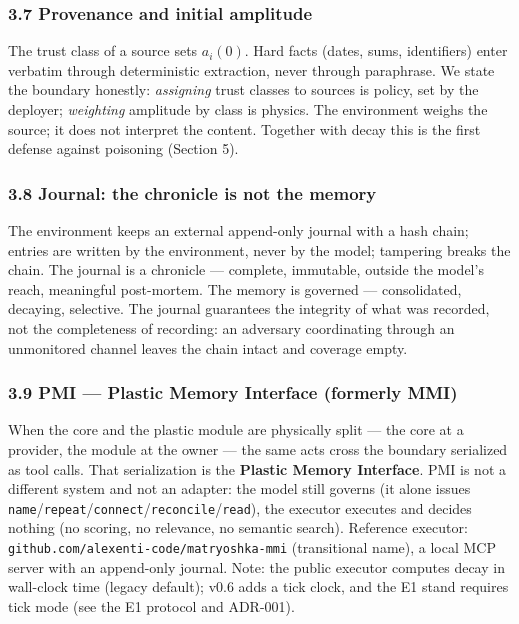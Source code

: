 \documentclass[
]{article}
\begin{document}
\subsubsection{3.7 Provenance and initial
amplitude}\label{provenance-and-initial-amplitude}

The trust class of a source sets \(a_i(0)\). Hard facts (dates, sums,
identifiers) enter verbatim through deterministic extraction, never
through paraphrase. We state the boundary honestly: \emph{assigning}
trust classes to sources is policy, set by the deployer;
\emph{weighting} amplitude by class is physics. The environment weighs
the source; it does not interpret the content. Together with decay this
is the first defense against poisoning (Section 5).

\subsubsection{3.8 Journal: the chronicle is not the
memory}\label{journal-the-chronicle-is-not-the-memory}

The environment keeps an external append-only journal with a hash chain;
entries are written by the environment, never by the model; tampering
breaks the chain. The journal is a chronicle --- complete, immutable,
outside the model's reach, meaningful post-mortem. The memory is
governed --- consolidated, decaying, selective. The journal guarantees
the integrity of what was recorded, not the completeness of recording:
an adversary coordinating through an unmonitored channel leaves the
chain intact and coverage empty.

\subsubsection{3.9 PMI --- Plastic Memory Interface (formerly
MMI)}\label{pmi-plastic-memory-interface-formerly-mmi}

When the core and the plastic module are physically split --- the core
at a provider, the module at the owner --- the same acts cross the
boundary serialized as tool calls. That serialization is the
\textbf{Plastic Memory Interface}. PMI is not a different system and not
an adapter: the model still governs (it alone issues
\texttt{name}/\texttt{repeat}/\texttt{connect}/\texttt{reconcile}/\texttt{read}),
the executor executes and decides nothing (no scoring, no relevance, no
semantic search). Reference executor:
\texttt{github.com/alexenti-code/matryoshka-mmi} (transitional name), a
local MCP server with an append-only journal. Note: the public executor
computes decay in wall-clock time (legacy default); v0.6 adds a tick
clock, and the E1 stand requires tick mode (see the E1 protocol and
ADR-001).
\end{document}
